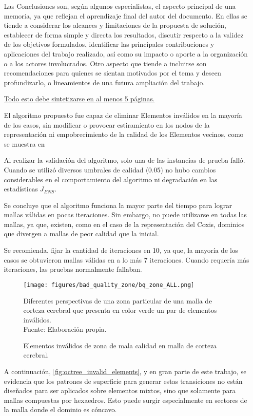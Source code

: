 
Las Conclusiones son, según algunos especialistas, el aspecto principal de una memoria, ya que reflejan el aprendizaje final del autor del documento. En ellas se tiende a considerar los alcances y limitaciones de la propuesta de solución, establecer de forma simple y directa los resultados, discutir respecto a la validez de los objetivos formulados, identificar las principales contribuciones y aplicaciones del trabajo realizado, así como su impacto o aporte a la organización o a los actores involucrados. Otro aspecto que tiende a incluirse son recomendaciones para quienes se sientan motivados por el tema y deseen profundizarlo, o lineamientos de una futura ampliación del trabajo.

\underline{Todo esto debe sintetizarse en al menos 5 páginas.}


El algoritmo propuesto fue capaz de eliminar Elementos inválidos en la mayoría de los casos, sin modificar o provocar estiramiento en los nodos de la representación ni empobrecimiento de la calidad de los Elementos vecinos, como se muestra en %

Al realizar la validación del algoritmo, solo una de las instancias de prueba falló. Cuando se utilizó diversos umbrales de calidad (0.05) no hubo cambios considerables en el comportamiento del algoritmo ni degradación en las estadísticas $J_{ENS}$.

Se concluye que el algoritmo funciona la mayor parte del tiempo para lograr mallas válidas en pocas iteraciones. Sin embargo, no puede utilizarse en todas las mallas, ya que, existen, como en el caso de la representación del Coxis, dominios que divergen a mallas de peor calidad que la inicial.


Se recomienda, fijar la cantidad de iteraciones en 10, ya que, la mayoría de los casos se obtuvieron mallas válidas en a lo más 7 iteraciones. Cuando requería más iteraciones, las pruebas normalmente fallaban.



\begin{figure}[!ht]
	\centering
	\texttt{[image: figures/bad\_quality\_zone/bq\_zone\_ALL.png]}
	\caption{\label{fig:octree_invalid_elements} Elementos inválidos de zona de mala calidad en malla de corteza cerebral.} 
	\small{Diferentes perspectivas de una zona particular de una malla de corteza cerebral que presenta en color verde un par de elementos inválidos.} \\ Fuente: Elaboración propia.
\end{figure}

A continuación, \autoref{fig:octree_invalid_elements}, y en gran parte de este trabajo, se evidencia que los patrones de superficie para generar estas transiciones no están diseñados para ser aplicados sobre elementos mixtos, sino que solamente para mallas compuestas por hexaedros.  Esto puede surgir especialmente en sectores de la malla donde el dominio es cóncavo. 